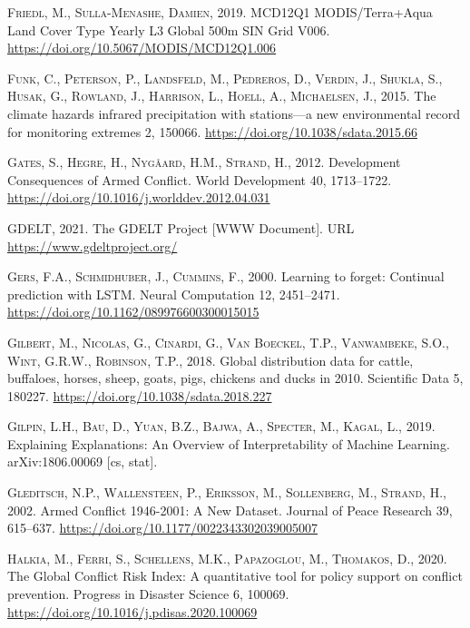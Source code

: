 \documentclass[a4paper,11pt]{article}
\begin{document}
\leavevmode\hypertarget{ref-friedlmark2019}{}%
\textsc{Friedl, M., Sulla-Menashe, Damien}, 2019. MCD12Q1 MODIS/Terra+Aqua Land Cover Type Yearly L3 Global 500m SIN Grid V006. \url{https://doi.org/10.5067/MODIS/MCD12Q1.006}

\leavevmode\hypertarget{ref-funk2015}{}%
\textsc{Funk, C., Peterson, P., Landsfeld, M., Pedreros, D., Verdin, J., Shukla, S., Husak, G., Rowland, J., Harrison, L., Hoell, A., Michaelsen, J.}, 2015. The climate hazards infrared precipitation with stations---a new environmental record for monitoring extremes 2, 150066. \url{https://doi.org/10.1038/sdata.2015.66}

\leavevmode\hypertarget{ref-gates2012}{}%
\textsc{Gates, S., Hegre, H., Nygåard, H.M., Strand, H.}, 2012. Development Consequences of Armed Conflict. World Development 40, 1713--1722. \url{https://doi.org/10.1016/j.worlddev.2012.04.031}

\leavevmode\hypertarget{ref-gdelt2021}{}%
\textsc{GDELT}, 2021. The GDELT Project {[}WWW Document{]}. URL \url{https://www.gdeltproject.org/}

\leavevmode\hypertarget{ref-gers2000}{}%
\textsc{Gers, F.A., Schmidhuber, J., Cummins, F.}, 2000. Learning to forget: Continual prediction with LSTM. Neural Computation 12, 2451--2471. \url{https://doi.org/10.1162/089976600300015015}

\leavevmode\hypertarget{ref-gilbert2018}{}%
\textsc{Gilbert, M., Nicolas, G., Cinardi, G., Van Boeckel, T.P., Vanwambeke, S.O., Wint, G.R.W., Robinson, T.P.}, 2018. Global distribution data for cattle, buffaloes, horses, sheep, goats, pigs, chickens and ducks in 2010. Scientific Data 5, 180227. \url{https://doi.org/10.1038/sdata.2018.227}

\leavevmode\hypertarget{ref-gilpin2019}{}%
\textsc{Gilpin, L.H., Bau, D., Yuan, B.Z., Bajwa, A., Specter, M., Kagal, L.}, 2019. Explaining Explanations: An Overview of Interpretability of Machine Learning. arXiv:1806.00069 {[}cs, stat{]}.

\leavevmode\hypertarget{ref-gleditsch2002a}{}%
\textsc{Gleditsch, N.P., Wallensteen, P., Eriksson, M., Sollenberg, M., Strand, H.}, 2002. Armed Conflict 1946-2001: A New Dataset. Journal of Peace Research 39, 615--637. \url{https://doi.org/10.1177/0022343302039005007}

\leavevmode\hypertarget{ref-halkia2020a}{}%
\textsc{Halkia, M., Ferri, S., Schellens, M.K., Papazoglou, M., Thomakos, D.}, 2020. The Global Conflict Risk Index: A quantitative tool for policy support on conflict prevention. Progress in Disaster Science 6, 100069. \url{https://doi.org/10.1016/j.pdisas.2020.100069}
\end{document}
